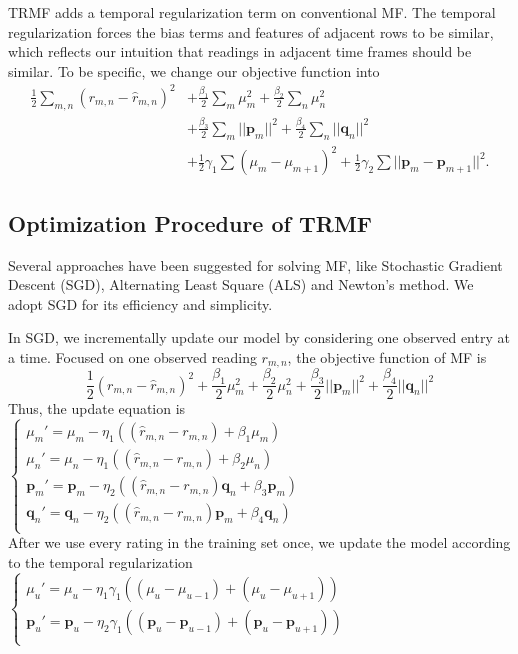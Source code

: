 TRMF adds a temporal regularization term on conventional MF.
The temporal regularization forces the bias terms and features of adjacent rows to be similar, which reflects our intuition that readings in adjacent time frames should be similar.
To be specific, we change our objective function into 
\begin{equation*}\begin{aligned}
\frac{1}{2}\sum_{m,n}{(r_{m,n} - \hat{r}_{m,n})}^2 &+ \frac{\beta_1}{2}\sum_m{\mu_m^2} + \frac{\beta_2}{2}\sum_n{\mu_n^2}\\
&+ \frac{\beta_3}{2}\sum_m{||\mathbf{p}_m||^2} + \frac{\beta_4}{2}\sum_n{||\mathbf{q}_n||^2}\\ 
&+ \frac{1}{2}\gamma_1\sum{(\mu_m-\mu_{m+1})^2} + \frac{1}{2}\gamma_2\sum{||\mathbf{p}_m-\mathbf{p}_{m+1}||^2}.
\end{aligned}\end{equation*}

\subsection{Optimization Procedure of TRMF}
\label{optimation_procedure}
Several approaches have been suggested for solving MF, like Stochastic Gradient Descent (SGD)\cite{koren2009matrix,chih2008large}, Alternating Least Square (ALS)\cite{koren2009matrix,zhou2008large} and Newton's method\cite{buchanan2005damped}.
We adopt SGD for its efficiency and simplicity. 

In SGD, we incrementally update our model by considering one observed entry at a time.
Focused on one observed reading $r_{m,n}$, the objective function of MF is
\begin{equation*} \frac{1}{2}(r_{m,n} - \hat{r}_{m,n})^2 + \frac{\beta_1}{2}\mu_m^2 + \frac{\beta_2}{2}\mu_n^2 + \frac{\beta_3}{2}||\mathbf{p}_m||^2 + \frac{\beta_4}{2}||\mathbf{q}_n||^2\end{equation*}
Thus, the update equation is\\
$\begin{cases}
	\mu_m' = \mu_m - \eta_1 ((\hat{r}_{m,n}-r_{m,n}) + \beta_1 \mu_m) \\
	\mu_n' = \mu_n - \eta_1 ((\hat{r}_{m,n}-r_{m,n}) + \beta_2 \mu_n) \\
	\mathbf{p}_{m}' = \mathbf{p}_{m} - \eta_2 ((\hat{r}_{m,n}-r_{m,n})\mathbf{q}_{n} + \beta_3 \mathbf{p}_{m})\\
	\mathbf{q}_{n}' = \mathbf{q}_{n} - \eta_2 ((\hat{r}_{m,n}-r_{m,n})\mathbf{p}_{m} + \beta_4 \mathbf{q}_{n})\\
\end{cases}$\\
After we use every rating in the training set once, we update the model according to the temporal regularization
$\begin{cases}
	\mu_u' = \mu_u - \eta_1 \gamma_1((\mu_u-\mu_{u-1})+(\mu_u-\mu_{u+1}))\\
	\mathbf{p}_{u}' = \mathbf{p}_{u} - \eta_2 \gamma_1((\mathbf{p}_{u}-\mathbf{p}_{u-1})+(\mathbf{p}_{u}-\mathbf{p}_{u+1}))\\
\end{cases}$

